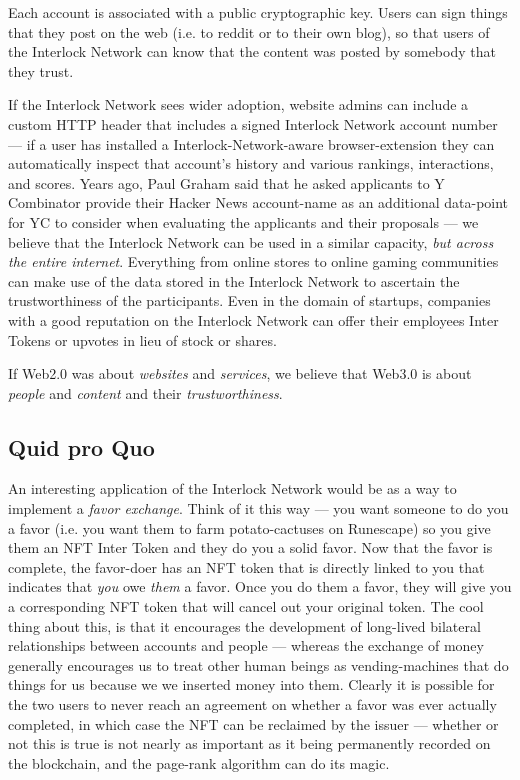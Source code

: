 \documentclass[a4paper]{article}
\begin{document}
Each account is associated with a public cryptographic key. Users can sign things that they post on the web (i.e. to reddit or to their own blog), so that users of the Interlock Network can know that the content was posted by somebody that they trust.

If the Interlock Network sees wider adoption, website admins can include a custom HTTP header that includes a signed Interlock Network account number ---  if a user has installed a Interlock-Network-aware browser-extension they can automatically inspect that account's history and various rankings, interactions, and scores. Years ago, Paul Graham said that he asked applicants to Y Combinator provide their Hacker News account-name as an additional data-point for YC to consider when evaluating the applicants and their proposals ---  we believe that the Interlock Network can be used in a similar capacity, \emph{but across the entire internet}. Everything from online stores to online gaming communities can make use of the data stored in the Interlock Network to ascertain the trustworthiness of the participants. Even in the domain of startups, companies with a good reputation on the Interlock Network can offer their employees Inter Tokens or upvotes in lieu of stock or shares.

If Web2.0 was about \emph{websites} and \emph{services}, we believe that Web3.0 is about \emph{people} and \emph{content} and their \emph{trustworthiness}.
\subsection{Quid pro Quo}
\label{Quid pro Quo}

An interesting application of the Interlock Network would be as a way to implement a \emph{favor exchange}. Think of it this way ---  you want someone to do you a favor (i.e. you want them to farm potato-cactuses on Runescape) so you give them an NFT Inter Token and they do you a solid favor. Now that the favor is complete, the favor-doer has an NFT token that is directly linked to you that indicates that \emph{you} owe \emph{them} a favor. Once you do them a favor, they will give you a corresponding NFT token that will cancel out your original token. The cool thing about this, is that it encourages the development of long-lived bilateral relationships between accounts and people ---  whereas the exchange of money generally encourages us to treat other human beings as vending-machines that do things for us because we we inserted money into them. Clearly it is possible for the two users to never reach an agreement on whether a favor was ever actually completed, in which case the NFT can be reclaimed by the issuer ---  whether or not this is true is not nearly as important as it being permanently recorded on the blockchain, and the page-rank algorithm can do its magic.
\end{document}
